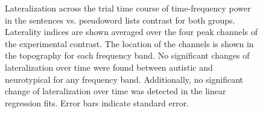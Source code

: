 \begin{figure}[!ht]
    \vspace{30pt}
	\centering
	\caption{Lateralization across the trial time course of time-frequency power in the sentences vs. pseudoword lists contrast for both groups. Laterality indices are shown averaged over the four peak channels of the experimental contrast. The location of the channels is shown in the topography for each frequency band. No significant changes of lateralization over time were found between autistic and neurotypical for any frequency band. Additionally, no significant change of lateralization over time was detected in the linear regression fits. Error bars indicate standard error. }
    \vspace*{-10pt}
	\label{fig:laterality-dynamics-peak}
\end{figure}


